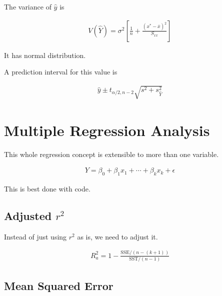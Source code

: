     The variance of $\hat{y}$ is

    \begin{equation*}
        \begin{aligned}
            V(\hat{Y}) = \sigma^2 \left[ \frac{1}{n} + \frac{ {\left( x^* - \overline{x} \right)}^2}{S_{xx} } \right]
        \end{aligned}
    \end{equation*}

    It has normal distribution.

    A prediction interval for this value is

    \begin{equation*}
        \begin{aligned}
            \hat{y} \pm t_{\alpha / 2, n - 2} \sqrt{s^2 + s^2_{\hat{Y} } }
        \end{aligned}
    \end{equation*}

\section{Multiple Regression Analysis}
This whole regression concept is extensible to more than one variable.

\begin{equation*}
    \begin{aligned}
        Y = \beta_0 + \beta_1 x_1 + \cdots + \beta_k x_k + \epsilon
    \end{aligned}
\end{equation*}

This is best done with code.

    \subsection{Adjusted $r^2$}
    Instead of just using $r^2$ as is, we need to adjust it.

    \begin{equation*}
        \begin{aligned}
            R^2_a = 1 - \frac{\text{SSE} / (n - (k + 1))}{\text{SST} / (n - 1)}
        \end{aligned}
    \end{equation*}

    \subsection{Mean Squared Error}


